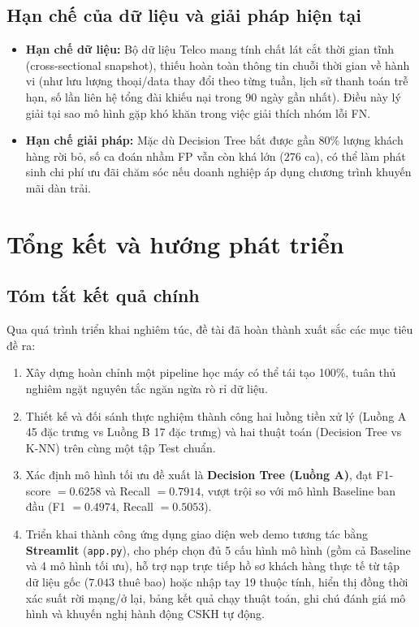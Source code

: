 \documentclass[12pt,a4paper]{article}
\begin{document}
\subsection{Hạn chế của dữ liệu và giải pháp hiện tại}
\begin{itemize}
    \item \textbf{Hạn chế dữ liệu:} Bộ dữ liệu Telco mang tính chất lát cắt thời gian tĩnh (cross-sectional snapshot), thiếu hoàn toàn thông tin chuỗi thời gian về hành vi (như lưu lượng thoại/data thay đổi theo từng tuần, lịch sử thanh toán trễ hạn, số lần liên hệ tổng đài khiếu nại trong 90 ngày gần nhất). Điều này lý giải tại sao mô hình gặp khó khăn trong việc giải thích nhóm lỗi FN.
    \item \textbf{Hạn chế giải pháp:} Mặc dù Decision Tree bắt được gần $80\%$ lượng khách hàng rời bỏ, số ca đoán nhầm FP vẫn còn khá lớn ($276$ ca), có thể làm phát sinh chi phí ưu đãi chăm sóc nếu doanh nghiệp áp dụng chương trình khuyến mãi dàn trải.
\end{itemize}

\section{Tổng kết và hướng phát triển}

\subsection{Tóm tắt kết quả chính}
Qua quá trình triển khai nghiêm túc, đề tài đã hoàn thành xuất sắc các mục tiêu đề ra:
\begin{enumerate}
    \item Xây dựng hoàn chỉnh một pipeline học máy có thể tái tạo 100\%, tuân thủ nghiêm ngặt nguyên tắc ngăn ngừa rò rỉ dữ liệu.
    \item Thiết kế và đối sánh thực nghiệm thành công hai luồng tiền xử lý (Luồng A 45 đặc trưng vs Luồng B 17 đặc trưng) và hai thuật toán (Decision Tree vs K-NN) trên cùng một tập Test chuẩn.
    \item Xác định mô hình tối ưu đề xuất là \textbf{Decision Tree (Luồng A)}, đạt F1-score $= 0.6258$ và Recall $= 0.7914$, vượt trội so với mô hình Baseline ban đầu (F1 $= 0.4974$, Recall $= 0.5053$).
    \item Triển khai thành công ứng dụng giao diện web demo tương tác bằng \textbf{Streamlit} (\texttt{app.py}), cho phép chọn đủ 5 cấu hình mô hình (gồm cả Baseline và 4 mô hình tối ưu), hỗ trợ nạp trực tiếp hồ sơ khách hàng thực tế từ tập dữ liệu gốc ($7.043$ thuê bao) hoặc nhập tay 19 thuộc tính, hiển thị đồng thời xác suất rời mạng/ở lại, bảng kết quả chạy thuật toán, ghi chú đánh giá mô hình và khuyến nghị hành động CSKH tự động.
\end{enumerate}
\end{document}
